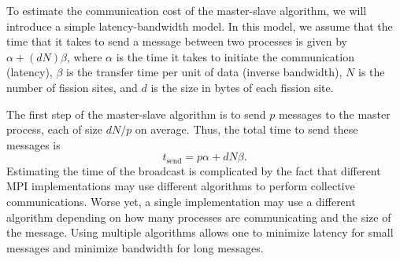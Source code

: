 To estimate the communication cost of the master-slave algorithm, we will
introduce a simple latency-bandwidth model. In this model, we assume that the
time that it takes to send a message between two processes is given by $\alpha +
(dN)\beta$, where $\alpha$ is the time it takes to initiate the communication
(latency), $\beta$ is the transfer time per unit of data (inverse bandwidth),
$N$ is the number of fission sites, and $d$ is the size in bytes of each fission
site.

The first step of the master-slave algorithm is to send $p$ messages to the
master process, each of size $dN/p$ on average. Thus, the total time to send
these messages is
\begin{equation}
  \label{eq:t-send}
  t_{\text{send}} = p\alpha + dN\beta.
\end{equation}
Estimating the time of the broadcast is complicated by the fact that different
MPI implementations may use different algorithms to perform collective
communications. Worse yet, a single implementation may use a different algorithm
depending on how many processes are communicating and the size of the
message. Using multiple algorithms allows one to minimize latency for small
messages and minimize bandwidth for long messages.

